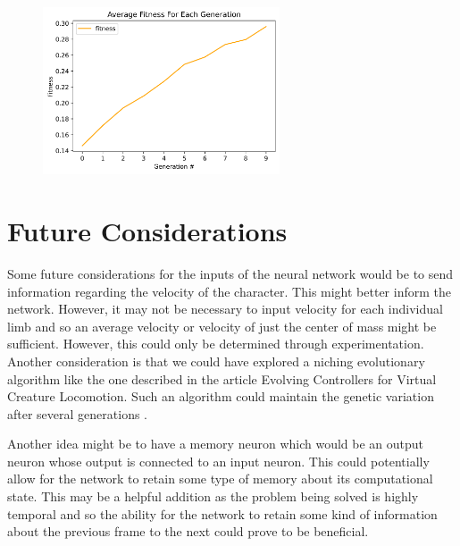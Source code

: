 \documentclass[letterpaper]{article} %
\begin{document}
\begin{figure}[h]
\caption
\centering
\includegraphics[width=7cm]{avg_fitness_per_gen.png}
\end{figure}


\section{Future Considerations}

Some future considerations for the inputs of the neural network would be to send information regarding the velocity of the character. This might better inform the network. However, it may not be necessary to input velocity for each individual limb and so an average velocity or velocity of just the center of mass might be sufficient. However, this could only be determined through experimentation. Another consideration is that we could have explored a niching evolutionary algorithm like the one described in the article Evolving Controllers for Virtual Creature Locomotion. Such an algorithm could maintain the genetic variation after several generations \cite{sanders_lobb_riddle_2003}.  

\par Another idea might be to have a memory neuron which would be an output neuron whose output is connected to an input neuron. This could potentially allow for the network to retain some type of memory about its computational state. This may be a helpful addition as the problem being solved is highly temporal and so the ability for the network to retain some kind of information about the previous frame to the next could prove to be beneficial.


\end{document}
